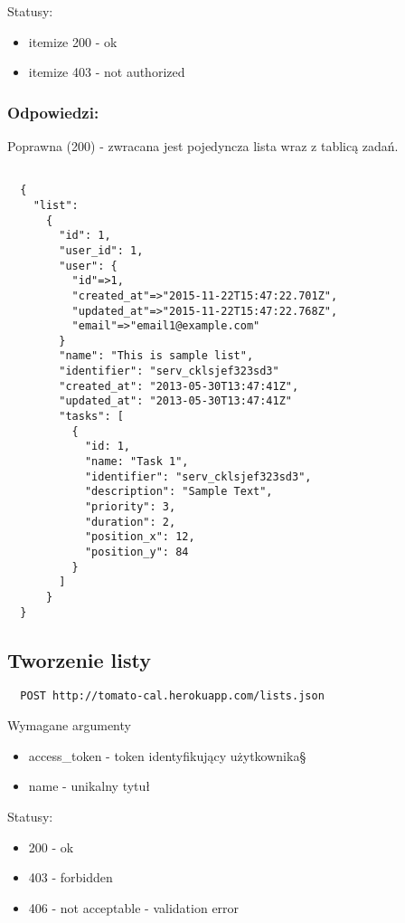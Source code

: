 Statusy:
\begin{itemize}
  \item itemize 200 - ok
  \item itemize 403 - not authorized
\end{itemize}

\subsubsection{Odpowiedzi:}
Poprawna (200) - zwracana jest pojedyncza lista wraz z tablicą zadań.
\begin{lstlisting}

  {
    "list":
      {
        "id": 1,
        "user_id": 1,
        "user": {
          "id"=>1,
          "created_at"=>"2015-11-22T15:47:22.701Z",
          "updated_at"=>"2015-11-22T15:47:22.768Z",
          "email"=>"email1@example.com"
        }
        "name": "This is sample list",
        "identifier": "serv_cklsjef323sd3"
        "created_at": "2013-05-30T13:47:41Z",
        "updated_at": "2013-05-30T13:47:41Z"
        "tasks": [
          {
            "id: 1,
            "name: "Task 1",
            "identifier": "serv_cklsjef323sd3",
            "description": "Sample Text",
            "priority": 3,
            "duration": 2,
            "position_x": 12,
            "position_y": 84
          }
        ]
      }
  }
\end{lstlisting}


\subsection{Tworzenie listy}

\begin{lstlisting}
  POST http://tomato-cal.herokuapp.com/lists.json
\end{lstlisting}

Wymagane argumenty
\begin{itemize}
  \item access\_token - token identyfikujący użytkownika§
  \item name - unikalny tytuł
\end{itemize}

Statusy:

\begin{itemize}
  \item 200 - ok
  \item 403 - forbidden
  \item 406 - not acceptable - validation error
\end{itemize}

